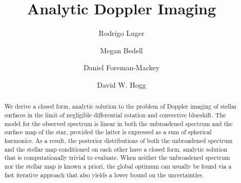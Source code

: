 \documentclass[modern]{aastex62}
\begin{document}
\title{Analytic Doppler Imaging}

\author[0000-0002-0296-3826]{Rodrigo Luger}
%
\author{Megan Bedell}
%
\author{Daniel Foreman-Mackey}
%
\author{David W. Hogg}

\begin{abstract} 
We derive a closed form, analytic solution to the problem of Doppler imaging
of stellar surfaces in the limit of negligible differential rotation and
convective blueshift. The model for the observed spectrum is linear in 
both the unbroadened spectrum and the surface map of the star, provided the
latter is expressed as a sum of spherical harmonics. As a result, the 
posterior distributions of both the unbroadened spectrum and the stellar map
conditioned on each other have a closed form, analytic solution that is 
computationally trivial to evaluate. When neither the unbroadened spectrum
nor the stellar map is known a priori, the global optimum can usually be
found via a fast iterative approach that also yields a lower bound on the
uncertainties.
%
\href{https://github.com/rodluger/paparazzi}{\color{linkcolor}\faGithub}
\end{abstract}

%
\end{document}
